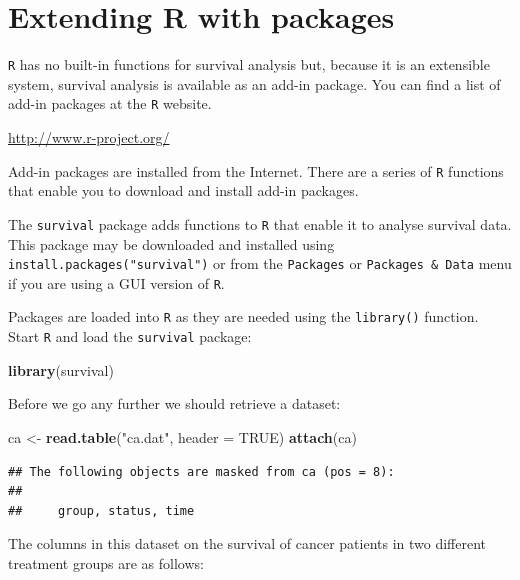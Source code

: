 \documentclass[]{book}
\newenvironment{Shaded}{\begin{snugshade}}{\end{snugshade}}
\newcommand{\KeywordTok}[1]{\textcolor[rgb]{0.13,0.29,0.53}{\textbf{#1}}}
\newcommand{\DataTypeTok}[1]{\textcolor[rgb]{0.13,0.29,0.53}{#1}}
\newcommand{\StringTok}[1]{\textcolor[rgb]{0.31,0.60,0.02}{#1}}
\newcommand{\OtherTok}[1]{\textcolor[rgb]{0.56,0.35,0.01}{#1}}
\newcommand{\NormalTok}[1]{#1}
\theoremstyle{definition}
\theoremstyle{definition}
\theoremstyle{definition}
\theoremstyle{remark}
\begin{document}
\hypertarget{exercise5}{%
\chapter{Extending R with packages}\label{exercise5}}

\texttt{R} has no built-in functions for survival analysis but, because
it is an extensible system, survival analysis is available as an add-in
package. You can find a list of add-in packages at the \texttt{R}
website.

\url{http://www.r-project.org/}

Add-in packages are installed from the Internet. There are a series of
\texttt{R} functions that enable you to download and install add-in
packages.

The \texttt{survival} package adds functions to \texttt{R} that enable
it to analyse survival data. This package may be downloaded and
installed using \texttt{install.packages("survival")} or from the
\texttt{Packages} or \texttt{Packages\ \&\ Data} menu if you are using a
GUI version of \texttt{R}.

Packages are loaded into \texttt{R} as they are needed using the
\texttt{library()} function. Start \texttt{R} and load the
\texttt{survival} package:

\begin{Shaded}
\begin{Highlighting}[]
\KeywordTok{library}\NormalTok{(survival)}
\end{Highlighting}
\end{Shaded}

Before we go any further we should retrieve a dataset:

\begin{Shaded}
\begin{Highlighting}[]
\NormalTok{ca <-}\StringTok{ }\KeywordTok{read.table}\NormalTok{(}\StringTok{"ca.dat"}\NormalTok{, }\DataTypeTok{header =} \OtherTok{TRUE}\NormalTok{)}
\KeywordTok{attach}\NormalTok{(ca)}
\end{Highlighting}
\end{Shaded}

\begin{verbatim}
## The following objects are masked from ca (pos = 8):
## 
##     group, status, time
\end{verbatim}

The columns in this dataset on the survival of cancer patients in two
different treatment groups are as follows:
\end{document}

